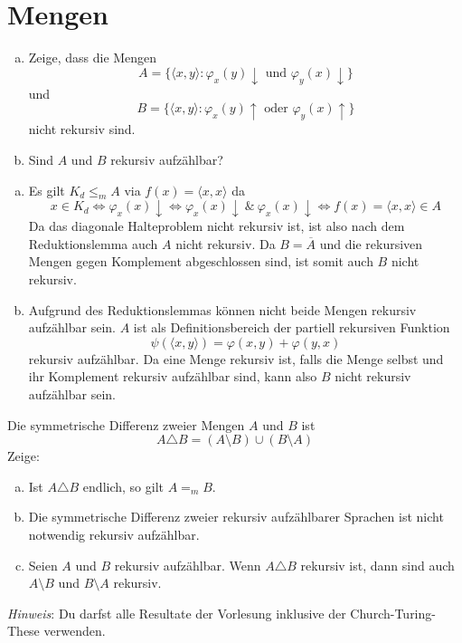 \documentclass[german,headsepline]{scrartcl}
\theoremstyle{definition}
\begin{document}
	\section{Mengen}
	\begin{question}[subtitle={Nachklausur 2012}]
		\begin{enumerate}[(a)]
			\item Zeige, dass die Mengen
				\[A=\{\langle x,y\rangle\colon\varphi_x(y)\downarrow\text{ und }\varphi_y(x)\downarrow\}\]
				und
				\[B=\{\langle x,y\rangle\colon\varphi_x(y)\uparrow\text{ oder }\varphi_y(x)\uparrow\}\]
				nicht rekursiv sind.
			\item Sind $A$ und $B$ rekursiv aufzählbar?
		\end{enumerate}
	\end{question}
	\begin{solution}
		\begin{enumerate}[(a)]
			\item Es gilt $K_d\leq_m A$ via $f(x)=\langle x,x\rangle$ da
				\[x\in K_d\Leftrightarrow\varphi_x(x)\downarrow\Leftrightarrow
				\varphi_x(x)\downarrow~\&~\varphi_x(x)\downarrow\Leftrightarrow
				f(x)=\langle x,x\rangle\in A\]
				Da das diagonale Halteproblem nicht rekursiv ist,
				ist also nach dem Reduktionslemma auch $A$ nicht rekursiv.
				Da $B=\overline{A}$ und die rekursiven Mengen gegen Komplement abgeschlossen sind,
				ist somit auch $B$ nicht rekursiv.
			\item Aufgrund des Reduktionslemmas können nicht beide Mengen rekursiv aufzählbar sein.
				$A$ ist als Definitionsbereich der partiell rekursiven Funktion
				\[\psi(\langle x,y\rangle)=\varphi(x,y)+\varphi(y,x)\]
				rekursiv aufzählbar.
				Da eine Menge rekursiv ist, falls die Menge selbst und ihr Komplement rekursiv aufzählbar sind,
				kann also $B$ nicht rekursiv aufzählbar sein.
		\end{enumerate}
	\end{solution}
	
	\begin{question}
		Die symmetrische Differenz zweier Mengen $A$ und $B$ ist
		\[A\triangle B=(A\setminus B)\cup(B\setminus A)\]
		Zeige:
		\begin{enumerate}[(a)]
			\item Ist $A\triangle B$ endlich, so gilt $A=_mB$.
			\item Die symmetrische Differenz zweier rekursiv aufzählbarer Sprachen ist nicht notwendig rekursiv aufzählbar.
			\item Seien $A$ und $B$ rekursiv aufzählbar.
			Wenn $A\triangle B$ rekursiv ist, dann sind auch $A\setminus B$ und $B\setminus A$ rekursiv.
		\end{enumerate}
		\textit{Hinweis}: Du darfst alle Resultate der Vorlesung inklusive der Church-Turing-These verwenden.
	\end{question}
	
\end{document}
